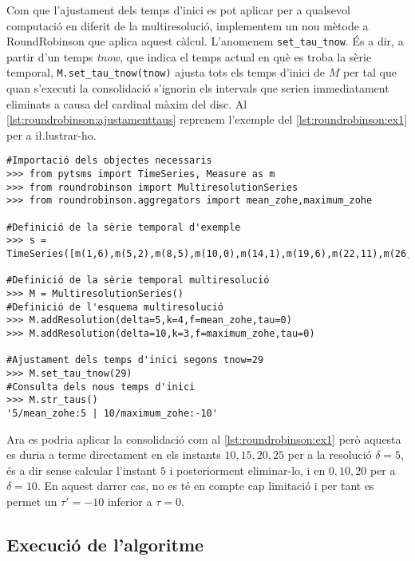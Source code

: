 Com que l'ajustament dels temps d'inici es pot aplicar per a qualsevol
computació en diferit de la multiresolució, implementem un nou mètode
a RoundRobinson que aplica aquest càlcul. L'anomenem
\lstinline[style=py]+set_tau_tnow+. És a dir, a partir d'un temps
\emph{tnow}, que indica el temps actual en què es troba la sèrie
temporal, \lstinline[style=py]+M.set_tau_tnow(tnow)+ ajusta tots els
temps d'inici de $M$ per tal que quan s'executi la consolidació
s'ignorin els intervals que serien immediatament eliminats a causa del
cardinal màxim del disc.  Al
\autoref{lst:roundrobinson:ajustamenttaus} reprenem l'exemple del
\autoref{lst:roundrobinson:ex1} per a i\l.lustrar-ho.

\begin{lstlisting}[style=py,caption=Exemple d'ajustament dels temps
    d'inici amb RoundRobinson,label=lst:roundrobinson:ajustamenttaus]
#Importació dels objectes necessaris
>>> from pytsms import TimeSeries, Measure as m
>>> from roundrobinson import MultiresolutionSeries
>>> from roundrobinson.aggregators import mean_zohe,maximum_zohe

#Definició de la sèrie temporal d'exemple
>>> s = TimeSeries([m(1,6),m(5,2),m(8,5),m(10,0),m(14,1),m(19,6),m(22,11),m(26,6),m(29,0)])

#Definició de la sèrie temporal multiresolució
>>> M = MultiresolutionSeries()
#Definició de l'esquema multiresolució
>>> M.addResolution(delta=5,k=4,f=mean_zohe,tau=0)
>>> M.addResolution(delta=10,k=3,f=maximum_zohe,tau=0)

#Ajustament dels temps d'inici segons tnow=29
>>> M.set_tau_tnow(29)
#Consulta dels nous temps d'inici
>>> M.str_taus()
'5/mean_zohe:5 | 10/maximum_zohe:-10'
\end{lstlisting}


Ara es podria aplicar la consolidació com al
\autoref{lst:roundrobinson:ex1} però aquesta es duria a terme
directament en els instants $10, 15, 20, 25$ per a la resolució
$\delta=5$, és a dir sense calcular l'instant $5$ i posteriorment
eliminar-lo, i en $0, 10, 20$ per a $\delta=10$. En aquest darrer cas,
no es té en compte cap limitació i per tant es permet un $\tau'=-10$
inferior a $\tau=0$.





\subsection{Execució de l'algoritme}


